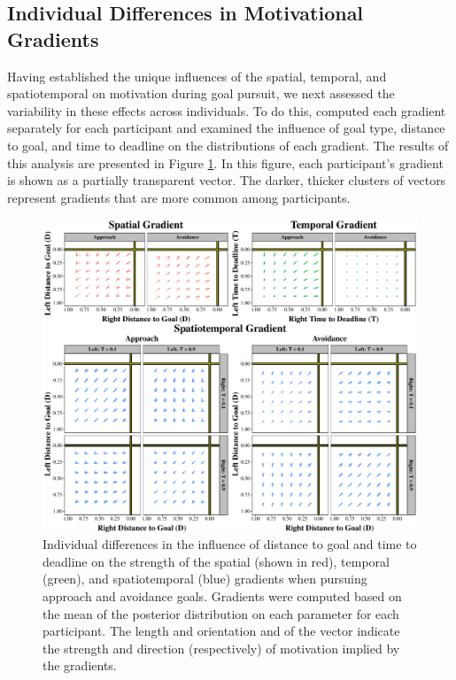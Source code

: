 \documentclass[a4paper,doc,natbib,donotrepeattitle]{apa6}
\begin{document}
\subsection{Individual Differences in Motivational Gradients}

Having established the unique influences of the spatial, temporal, and spatiotemporal on motivation during goal pursuit, we next assessed the variability in these effects across individuals. To do this, computed each gradient separately for each participant and examined the influence of goal type, distance to goal, and time to deadline on the distributions of each gradient. The results of this analysis are presented in Figure \ref{fig:ids_in_each_gradient}. In this figure, each participant's gradient is shown as a partially transparent vector. The darker, thicker clusters of vectors represent gradients that are more common among participants.

\begin{figure}[h!]
\centering
\includegraphics[width=1\textwidth]{ids_in_each_gradient_norm.pdf}
\caption{\label{fig:ids_in_each_gradient}  Individual differences in the influence of distance to goal and time to deadline on the strength of the spatial (shown in red), temporal (green), and spatiotemporal (blue) gradients when pursuing approach and avoidance goals. Gradients were computed based on the mean of the posterior distribution on each parameter for each participant. The length and orientation and of the vector indicate the strength and direction (respectively) of motivation implied by the gradients.}
\end{figure}
\end{document}
